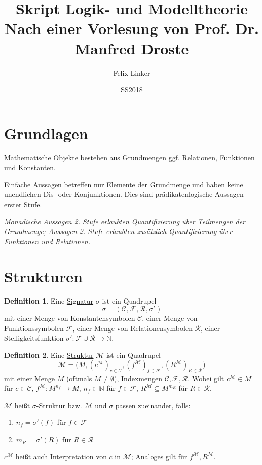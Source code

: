 \documentclass{article}
\title{Skript Logik- und Modelltheorie \\ \large{Nach einer Vorlesung von Prof. Dr. Manfred Droste}}
\author{Felix Linker}
\date{SS2018}
\theoremstyle{definition}
\newtheorem{dfn}{Definition}[section]
\theoremstyle{plain}
\newcommand{\m}[1]{\mathcal{#1}}
\newcommand{\sign}[1]{(\m{C}_{#1}, \m{F}_{#1}, \m{R}_{#1}, \sigma'_{#1})}
\newcommand{\struc}[3]{\big(#1, (c^{#2})_{c \in \m{C}_{#3}}, (f^{#2})_{f \in \m{F}_{#3}}, (R^{#2})_{R \in \m{R}_{#3}}\big)}
\begin{document}
    \maketitle

    \nocite{*}
    
    

    \section*{Grundlagen}

    Mathematische Objekte bestehen aus Grundmengen ggf. Relationen, Funktionen und Konstanten.

    Einfache Aussagen betreffen nur Elemente der Grundmenge und haben keine unendlichen Dis- oder Konjunktionen.
    Dies sind prädikatenlogische Aussagen erster Stufe.

    \textit{Monadische Aussagen 2. Stufe erlaubten Quantifizierung über Teilmengen der Grundmenge; Aussagen 2. Stufe erlaubten zusätzlich Quantifizierung über Funktionen und Relationen.}

    \section{Strukturen}

    \begin{dfn}
        Eine \underline{Signatur} $ \sigma $ ist ein Quadrupel
        \begin{equation*}
            \sigma = \sign{}
        \end{equation*}
        mit einer Menge von Konstantensymbolen $ \m{C} $, einer Menge von Funktionssymbolen $ \m{F} $, einer Menge von Relationensymbolen $ \m{R} $, einer Stelligkeitsfunktion $ \sigma' : \m{F} \cup \m{R} \rightarrow \mathbb{N} $.
    \end{dfn}

    \begin{dfn}
        Eine \underline{Struktur} $ \m{M} $ ist ein Quadrupel
        \begin{equation*}
            \m{M} = \struc{M}{\m{M}}{}
        \end{equation*}
        mit einer Menge $ M $ (oftmals $ M \neq \emptyset $), Indexmengen $ \m{C}, \m{F}, \m{R} $.
        Wobei gilt $ c^\m{M} \in M $ für $ c \in \m{C} $, $ f^\m{M} : M^{n_f} \rightarrow M $, $ n_f \in \mathbb{N} $ für $ f \in \m{F} $, $ R^\m{M} \subseteq M^{m_R} $ für $ R \in \m{R} $.

        $ \m{M} $ heißt \underline{$ \sigma $-Struktur} bzw. $ \m{M} $ und $ \sigma $ \underline{passen zueinander}, falls:
        \begin{enumerate}
            \item $ n_f = \sigma'(f) $ für $ f \in \m{F} $
            \item $ m_R = \sigma'(R) $ für $ R \in \m{R} $
        \end{enumerate}

        $ c^\m{M} $ heißt auch \underline{Interpretation} von $ c $ in $ \m{M} $; Analoges gilt für $ f^\m{M}, R^\m{M} $.
    \end{dfn}
\end{document}
